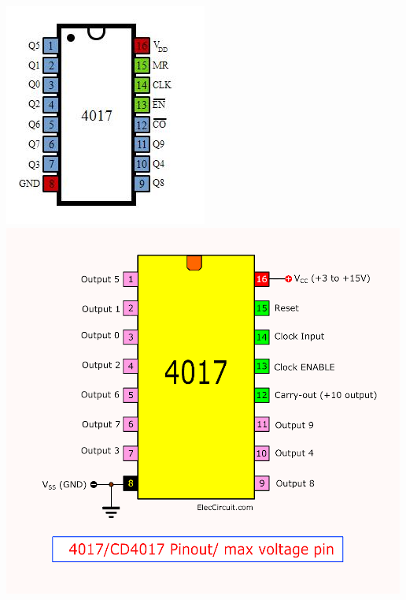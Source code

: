\documentclass[pstricks,border=11pt]{article}
\begin{document}
\includegraphics[scale=1]{IC-4017-Pin-Diagram.jpeg}
\hfill \break
\includegraphics[scale=.5]{images/CD4017-pinout.png}
\hfill \break
\vspace{15mm}
\end{document}
